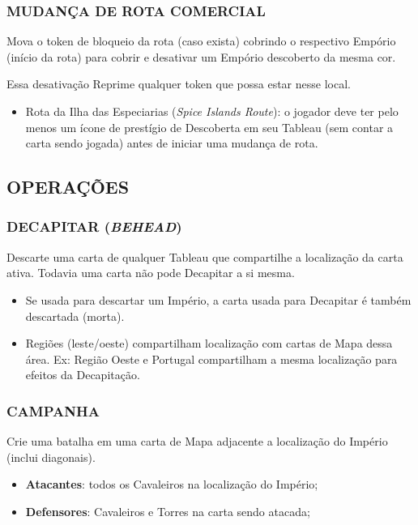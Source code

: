 \documentclass[11pt]{article}
\begin{document}
\subsubsection{MUDANÇA DE ROTA COMERCIAL}
\label{sec:org44b7f92}

Mova o token de bloqueio da rota (caso exista) cobrindo o respectivo Empório (início da rota) para cobrir e desativar um Empório descoberto da mesma cor.

Essa desativação Reprime qualquer token que possa estar nesse local.

\begin{itemize}
\item Rota da Ilha das Especiarias (\emph{Spice Islands Route}): o jogador deve ter pelo menos um ícone de prestígio de Descoberta em seu Tableau (sem contar a carta sendo jogada) antes de iniciar uma mudança de rota.
\end{itemize}

\subsection{OPERAÇÕES}
\label{sec:org62a165e}

\subsubsection{DECAPITAR (\emph{BEHEAD})}
\label{sec:orgdac29ac}

Descarte uma carta de qualquer Tableau que compartilhe a localização da carta ativa. Todavia uma carta não pode Decapitar a si mesma.

\begin{itemize}
\item Se usada para descartar um Império, a carta usada para Decapitar é também descartada (morta).

\item Regiões (leste/oeste) compartilham localização com cartas de Mapa dessa área. Ex: Região Oeste e Portugal compartilham a mesma localização para efeitos da Decapitação.
\end{itemize}

\subsubsection{CAMPANHA}
\label{sec:org4f36463}

Crie uma batalha em uma carta de Mapa adjacente a localização do Império (inclui diagonais).

\begin{itemize}
\item \textbf{Atacantes}: todos os Cavaleiros na localização do Império;

\item \textbf{Defensores}: Cavaleiros e Torres na carta sendo atacada;
\end{itemize}
\end{document}
